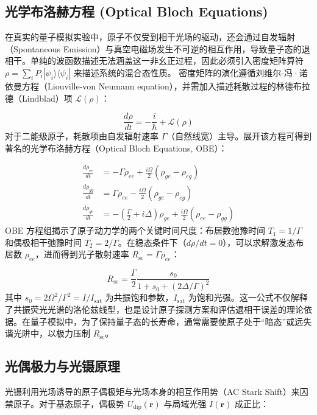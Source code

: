 \documentclass[../main.tex]{subfiles}
\begin{document}
\subsection{光学布洛赫方程 (Optical Bloch Equations)}
在真实的量子模拟实验中，原子不仅受到相干光场的驱动，还会通过自发辐射（Spontaneous Emission）与真空电磁场发生不可逆的相互作用，导致量子态的退相干。单纯的波函数描述无法涵盖这一非幺正过程，因此必须引入密度矩阵算符 $\rho = \sum_i P_i |\psi_i\rangle\langle\psi_i|$ 来描述系统的混合态性质。
密度矩阵的演化遵循刘维尔-冯·诺依曼方程（Liouville-von Neumann equation），并需加入描述耗散过程的林德布拉德（Lindblad）项 $\mathcal{L}(\rho)$：

\begin{equation}
\frac{d\rho}{dt} = -\frac{i}{\hbar} + \mathcal{L}(\rho)
\end{equation}
对于二能级原子，耗散项由自发辐射速率 $\Gamma$（自然线宽）主导。展开该方程可得到著名的光学布洛赫方程（Optical Bloch Equations, OBE）：

\begin{equation}
\begin{aligned} \frac{d\rho_{ee}}{dt} &= -\Gamma \rho_{ee} + \frac{i\Omega}{2}(\rho_{ge} - \rho_{eg}) \\ \frac{d\rho_{gg}}{dt} &= \Gamma \rho_{ee} - \frac{i\Omega}{2}(\rho_{ge} - \rho_{eg}) \\ \frac{d\rho_{ge}}{dt} &= -\left(\frac{\Gamma}{2} + i\Delta\right)\rho_{ge} + \frac{i\Omega}{2}(\rho_{ee} - \rho_{gg}) \end{aligned}
\end{equation}
OBE 方程组揭示了原子动力学的两个关键时间尺度：布居数弛豫时间 $T_1 = 1/\Gamma$ 和偶极相干弛豫时间 $T_2 = 2/\Gamma$。在稳态条件下（$d\rho/dt = 0$），可以求解激发态布居数 $\rho_{ee}$，进而得到光子散射速率 $R_{\text{sc}} = \Gamma \rho_{ee}$：

\begin{equation}
R_{\text{sc}} = \frac{\Gamma}{2} \frac{s_0}{1 + s_0 + (2\Delta/\Gamma)^2}
\end{equation}
其中 $s_0 = 2\Omega^2/\Gamma^2 = I/I_{\text{sat}}$ 为共振饱和参数，$I_{\text{sat}}$ 为饱和光强。这一公式不仅解释了共振荧光光谱的洛伦兹线型，也是设计原子探测方案和评估退相干误差的理论依据。在量子模拟中，为了保持量子态的长寿命，通常需要使原子处于“暗态”或远失谐光阱中，以极力压制 $R_{\text{sc}}$。

\subsection{光偶极力与光镊原理}
光镊利用光场诱导的原子偶极矩与光场本身的相互作用势（AC Stark Shift）来囚禁原子。对于基态原子，偶极势 $U_{\text{dip}}(\mathbf{r})$ 与局域光强 $I(\mathbf{r})$ 成正比：
\end{document}

